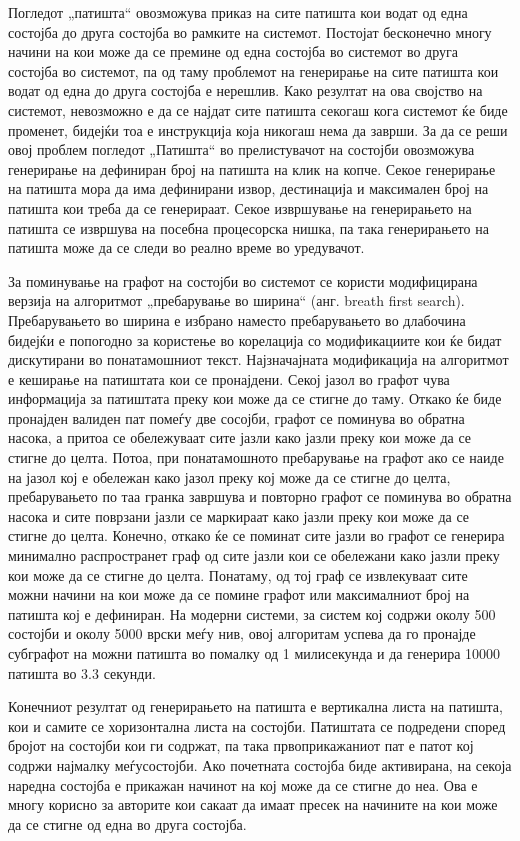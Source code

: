 Погледот „патишта“ овозможува приказ на сите патишта кои водат од една состојба до друга состојба во рамките на системот. Постојат бесконечно многу начини на кои може да се премине од една состојба во системот во друга состојба во системот, па од таму проблемот на генерирање на сите патишта кои водат од една до друга состојба е нерешлив. Како резултат на ова својство на системот, невозможно е да се најдат сите патишта секогаш кога системот ќе биде променет, бидејќи тоа е инструкција која никогаш нема да заврши. За да се реши овој проблем погледот „Патишта“ во прелистувачот на состојби овозможува генерирање на дефиниран број на патишта на клик на копче. Секое генерирање на патишта мора да има дефинирани извор, дестинација и максимален број на патишта кои треба да се генерираат. Секое извршување на генерирањето на патишта се извршува на посебна процесорска нишка, па така генерирањето на патишта може да се следи во реално време во уредувачот.

За поминување на графот на состојби во системот се користи модифицирана верзија на алгоритмот „пребарување во ширина“ (анг. breath first search). Пребарувањето во ширина е избрано наместо пребарувањето во длабочина бидејќи е попогодно за користење во корелација со модификациите кои ќе бидат дискутирани во понатамошниот текст. Најзначајната модификација на алгоритмот е кеширање на патиштата кои се пронајдени. Секој јазол во графот чува информација за патиштата преку кои може да се стигне до таму. Откако ќе биде пронајден валиден пат помеѓу две сосојби, графот се поминува во обратна насока, а притоа се обележуваат сите јазли како јазли преку кои може да се стигне до целта. Потоа, при понатамошното пребарување на графот ако се наиде на јазол кој е обележан како јазол преку кој може да се стигне до целта, пребарувањето по таа гранка завршува и повторно графот се поминува во обратна насока и сите поврзани јазли се маркираат како јазли преку кои може да се стигне до целта. Конечно, откако ќе се поминат сите јазли во графот се генерира минимално распространет граф од сите јазли кои се обележани како јазли преку кои може да се стигне до целта. Понатаму, од тој граф се извлекуваат сите можни начини на кои може да се помине графот или максималниот број на патишта кој е дефиниран. На модерни системи, за систем кој содржи околу 500 состојби и околу 5000 врски меѓу нив, овој алгоритам успева да го пронајде субграфот на можни патишта во помалку од 1 милисекунда и да генерира 10000 патишта во 3.3 секунди.

Конечниот резултат од генерирањето на патишта е вертикална листа на патишта, кои и самите се хоризонтална листа на состојби. Патиштата се подредени според бројот на состојби кои ги содржат, па така првоприкажаниот пат е патот кој содржи најмалку меѓусостојби. Ако почетната состојба биде активирана, на секоја наредна состојба е прикажан начинот на кој може да се стигне до неа. Ова е многу корисно за авторите кои сакаат да имаат пресек на начините на кои може да се стигне од една во друга состојба.


